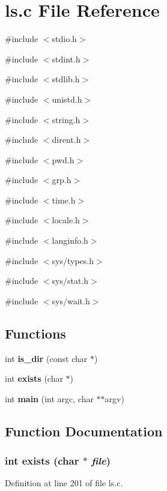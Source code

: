 \section{ls.c File Reference}
\label{ls_8c}
{\ttfamily \#include $<$stdio.h$>$}\par
{\ttfamily \#include $<$stdint.h$>$}\par
{\ttfamily \#include $<$stdlib.h$>$}\par
{\ttfamily \#include $<$unistd.h$>$}\par
{\ttfamily \#include $<$string.h$>$}\par
{\ttfamily \#include $<$dirent.h$>$}\par
{\ttfamily \#include $<$pwd.h$>$}\par
{\ttfamily \#include $<$grp.h$>$}\par
{\ttfamily \#include $<$time.h$>$}\par
{\ttfamily \#include $<$locale.h$>$}\par
{\ttfamily \#include $<$langinfo.h$>$}\par
{\ttfamily \#include $<$sys/types.h$>$}\par
{\ttfamily \#include $<$sys/stat.h$>$}\par
{\ttfamily \#include $<$sys/wait.h$>$}\par
\subsection*{Functions}
\begin{DoxyCompactItemize}
\item 
int {\bf is\_\-dir} (const char $\ast$)
\item 
int {\bf exists} (char $\ast$)
\item 
int {\bf main} (int argc, char $\ast$$\ast$argv)
\end{DoxyCompactItemize}


\subsection{Function Documentation}
\subsubsection[{exists}]{\setlength{\rightskip}{0pt plus 5cm}int exists (char $\ast$ {\em file})}\label{ls_8c_a436bca6fd78f0ec6e0b6a304affe17e6}


Definition at line 201 of file ls.c.

